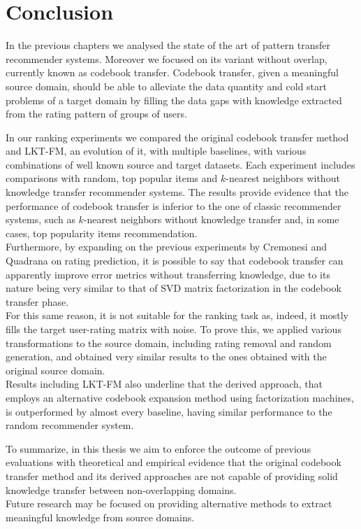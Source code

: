 \chapter{Conclusion}
\label{ch:conclusion}

In the previous chapters we analysed the state of the art of pattern transfer recommender systems. Moreover we focused on its variant without overlap, currently known as codebook transfer. Codebook transfer, given a meaningful source domain, should be able to alleviate the data quantity and cold start problems of a target domain by filling the data gaps with knowledge extracted from the rating pattern of groups of users.\par
In our ranking experiments we compared the original codebook transfer method and LKT-FM, an evolution of it, with multiple baselines, with various combinations of well known source and target datasets. Each experiment includes comparisons with random, top popular items and $k$-nearest neighbors without knowledge transfer recommender systems. The results provide evidence that the performance of codebook transfer is inferior to the one of classic recommender systems, such as $k$-nearest neighbors without knowledge transfer and, in some cases, top popularity items recommendation.\\
Furthermore, by expanding on the previous experiments by Cremonesi and Quadrana on rating prediction, it is possible to say that codebook transfer can apparently improve error metrics without transferring knowledge, due to its nature being very similar to that of SVD matrix factorization in the codebook transfer phase.\\
For this same reason, it is not suitable for the ranking task as, indeed, it mostly fills the target user-rating matrix with noise. To prove this, we applied various transformations to the source domain, including rating removal and random generation, and obtained very similar results to the ones obtained with the original source domain.\\
Results including LKT-FM also underline that the derived approach, that employs an alternative codebook expansion method using factorization machines, is outperformed by almost every baseline, having similar performance to the random recommender system.\par
To summarize, in this thesis we aim to enforce the outcome of previous evaluations with theoretical and empirical evidence that the original codebook transfer method and its derived approaches are not capable of providing solid knowledge transfer between non-overlapping domains.\\
Future research may be focused on providing alternative methods to extract meaningful knowledge from source domains.
